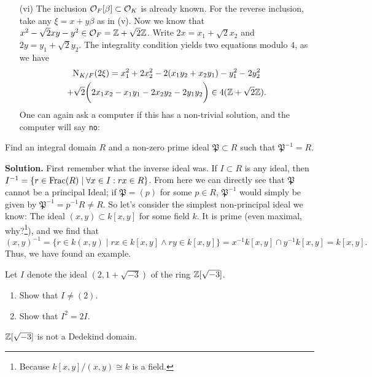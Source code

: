\documentclass[a4paper,11pt]{article}
\begin{document}
\begin{enumerate}[labelindent=0pt, wide]
    \item[(vi)] The inclusion $\mathcal{O}_F[\beta] \subset \mathcal{O}_K$ is already
        known. For the reverse inclusion, take any $\xi = x + y\beta$ as in (v).
        Now we know that $x^2 - \sqrt 2 xy - y^2 \in \mathcal{O}_F = \mathbb{Z} + \sqrt 2 \mathbb{Z}$. 
        Write $2x = x_1 + \sqrt 2 x_2$ and $2y= y_1 + \sqrt 2 y_2$. The integrality 
        condition yields two equations modulo $4$, as we have
        \begin{multline*}
            \operatorname{N}_{K/F}(2\xi) = x_1^2 + 2x_2^2 - 2(x_1 y_2 + x_2 y_1) - y_1^2 -
            2y_2^2 \\ 
            + \sqrt 2\bigg ( 2x_1x_2 - x_1 y_1 - 2x_2y_2 -2y_1y_2 \bigg) \in
            4(\mathbb{Z} +
            \sqrt 2 \mathbb{Z}).
        \end{multline*}
        One can again ask a computer if this has a non-trivial solution, and the
        computer will say \texttt{no}:
        
        

\end{enumerate}

 Find an integral domain $R$ and a non-zero prime ideal
$\mathfrak P \subset R$ such that $\mathfrak P^{-1} = R$.

\textbf{Solution.}
First remember what the inverse ideal was. If $I \subset R$ is any ideal, 
then $I^{-1} = \{r \in \mathrm{Frac}(R) \mid \forall x \in I: r x \in R  \}$. From here
we can directly see that $\mathfrak P$ cannot be a principal Ideal; if 
$\mathfrak P = (p)$ for some $p \in R$, $\mathfrak P^{-1}$ would simply be given
by $\mathfrak P^{-1}= p^{-1} R \neq R$. So let's consider the simplest
non-principal ideal we know: The ideal $(x,y) \subset k[x,y]$ for some field $k$. 
It is prime (even maximal, why?\footnote{Because $k[x,y]/(x,y) \cong k$ is a
field.}), and we find that
\begin{equation*}
    (x,y)^{-1} = \{r \in k(x,y) \mid rx \in k[x,y] \wedge ry \in k[x,y]\}
    = x^{-1}k[x,y] \cap y^{-1}k[x,y] = k[x,y].
\end{equation*}
Thus, we have found an example.


 Let $I$ denote the ideal $(2, 1 + \sqrt{-3})$ of the ring
$\mathbb{Z}[\sqrt{-3}]$. 
\begin{enumerate}
    \item Show that $I \neq (2)$. 
    \item Show that $I^2 = 2I$. 
\end{enumerate}
$\mathbb{Z}[\sqrt{-3}]$ is not a Dedekind domain.
\end{document}
